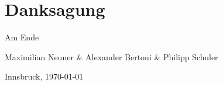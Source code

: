 \section*{Danksagung}

Am Ende
\vspace{1cm}

Maximilian Neuner \& Alexander Bertoni \& Philipp Schuler

Innsbruck, \today

\newpage